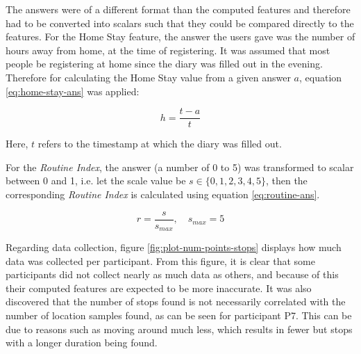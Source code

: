 The answers were of a different format than the computed features and therefore had to be converted into scalars such that they could be compared directly to the features. For the Home Stay feature, the answer the users gave was the number of hours away from home, at the time of registering. It was assumed that most people be registering at home since the diary was filled out in the evening. Therefore for calculating the Home Stay value from a given answer $a$, equation \ref{eq:home-stay-ans} was applied:

\begin{equation}
\label{eq:home-stay-ans}
    h = \frac{t - a }{t}
\end{equation}

Here, $t$ refers to the timestamp at which the diary was filled out.

For the \textit{Routine Index}, the answer (a number of 0 to 5) was transformed to scalar between 0 and 1, i.e. let the scale value be $s \in \{0, 1, 2, 3, 4, 5\}$, then the corresponding \textit{Routine Index} is calculated using equation \ref{eq:routine-ans}.

\begin{equation}
\label{eq:routine-ans}
    r = \frac{s}{s_{max}}, \quad s_{max} = 5
\end{equation}

Regarding data collection, figure \ref{fig:plot-num-points-stops} displays how much data was collected per participant. From this figure, it is clear that some participants did not collect nearly as much data as others, and because of this their computed features are expected to be more inaccurate. It was also discovered that the number of stops found is not necessarily correlated with the number of location samples found, as can be seen for participant P7. This can be due to reasons such as moving around much less, which results in fewer but stops with a longer duration being found. \\

